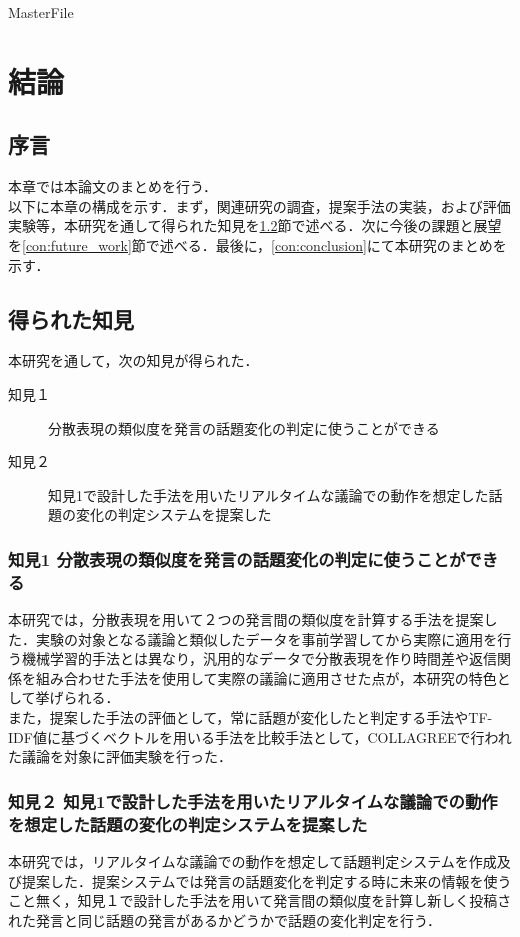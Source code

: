 \expandafter\ifx\csname MasterFile\endcsname\relax
\def\SubFile{hoge}


\setcounter{chapter}{5}
\fi
\cleardoublepage
\chapter{結論}
\label{con:chapter}

\section{序言}
\label{con:introduction}
本章では本論文のまとめを行う．\\
以下に本章の構成を示す．まず，関連研究の調査，提案手法の実装，および評価実験等，本研究を通して得られた知見を\ref{con:knowledge}節で述べる．次に今後の課題と展望を\ref{con:future_work}節で述べる．最後に，\ref{con:conclusion}にて本研究のまとめを示す．

\section{得られた知見}
\label{con:knowledge}
本研究を通して，次の知見が得られた．
\begin{description}
  \item[知見１] 分散表現の類似度を発言の話題変化の判定に使うことができる
  \item[知見２] 知見1で設計した手法を用いたリアルタイムな議論での動作を想定した話題の変化の判定システムを提案した
\end{description}

\subsection*{知見1 分散表現の類似度を発言の話題変化の判定に使うことができる}
本研究では，分散表現を用いて２つの発言間の類似度を計算する手法を提案した．実験の対象となる議論と類似したデータを事前学習してから実際に適用を行う機械学習的手法とは異なり，汎用的なデータで分散表現を作り時間差や返信関係を組み合わせた手法を使用して実際の議論に適用させた点が，本研究の特色として挙げられる．\\
また，提案した手法の評価として，常に話題が変化したと判定する手法やTF-IDF値に基づくベクトルを用いる手法を比較手法として，COLLAGREEで行われた議論を対象に評価実験を行った．
\subsection*{知見２ 知見1で設計した手法を用いたリアルタイムな議論での動作を想定した話題の変化の判定システムを提案した}
本研究では，リアルタイムな議論での動作を想定して話題判定システムを作成及び提案した．提案システムでは発言の話題変化を判定する時に未来の情報を使うこと無く，知見１で設計した手法を用いて発言間の類似度を計算し新しく投稿された発言と同じ話題の発言があるかどうかで話題の変化判定を行う．


